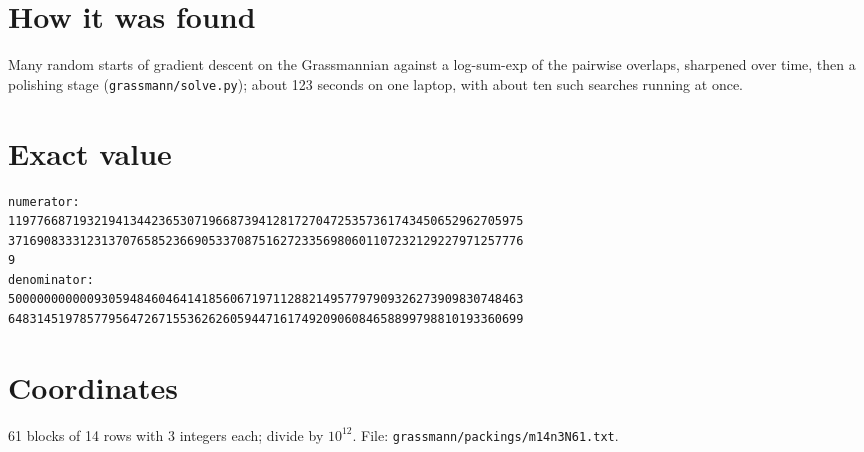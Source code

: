 \documentclass[11pt,a4paper]{article}
\begin{document}
\section{How it was found}
Many random starts of gradient descent on the Grassmannian against a log-sum-exp of the pairwise overlaps, sharpened over time, then a polishing stage (\texttt{grassmann/solve.py}); about 123 seconds on one laptop, with about ten such searches running at once.


\appendix
\section{Exact value}
{\small
\begin{verbatim}
numerator:
119776687193219413442365307196687394128172704725357361743450652962705975
371690833312313707658523669053370875162723356980601107232129227971257776
9
denominator:
500000000000930594846046414185606719711288214957797909326273909830748463
648314519785779564726715536262605944716174920906084658899798810193360699
\end{verbatim}}

\section{Coordinates}
61 blocks of 14 rows with 3 integers each; divide by $10^{12}$. File: \texttt{grassmann/packings/m14n3N61.txt}.
{\tiny
\begin{multicols}{3}
\end{multicols}}
\end{document}
